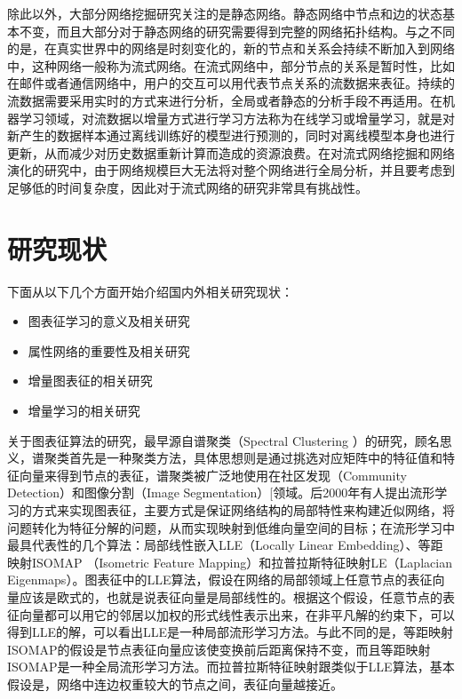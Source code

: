 除此以外，大部分网络挖掘研究关注的是静态网络。静态网络中节点和边的状态基本不变，而且大部分对于静态网络的研究需要得到完整的网络拓扑结构。与之不同的是，在真实世界中的网络是时刻变化的，新的节点和关系会持续不断加入到网络中，这种网络一般称为流式网络\cite{aggarwal2014evolutionary}。在流式网络中，部分节点的关系是暂时性，比如在邮件或者通信网络中，用户的交互可以用代表节点关系的流数据来表征。持续的流数据需要采用实时的方式来进行分析，全局或者静态的分析手段不再适用。在机器学习领域，对流数据以增量方式进行学习方法称为在线学习或增量学习，就是对新产生的数据样本通过离线训练好的模型进行预测的，同时对离线模型本身也进行更新，从而减少对历史数据重新计算而造成的资源浪费。在对流式网络挖掘和网络演化的研究中，由于网络规模巨大无法将对整个网络进行全局分析，并且要考虑到足够低的时间复杂度，因此对于流式网络的研究非常具有挑战性\cite{zhao2011gsketch,le2012linked}。

\section{研究现状}
下面从以下几个方面开始介绍国内外相关研究现状：
\begin{itemize}
\item {图表征学习的意义及相关研究}
\item {属性网络的重要性及相关研究}
\item {增量图表征的相关研究}
\item {增量学习的相关研究}
\end{itemize}

关于图表征算法的研究，最早源自谱聚类（Spectral Clustering ）的研究，顾名思义，谱聚类首先是一种聚类方法，具体思想则是通过挑选对应矩阵中的特征值和特征向量来得到节点的表征，谱聚类被广泛地使用在社区发现（Community Detection）\cite{leskovec2010empirical}和图像分割（Image Segmentation）[\cite{shi2000normalized}领域。后2000年有人提出流形学习的方式来实现图表征，主要方式是保证网络结构的局部特性来构建近似网络，将问题转化为特征分解的问题，从而实现映射到低维向量空间的目标；在流形学习中最具代表性的几个算法：局部线性嵌入\cite{roweis2000nonlinear}LLE（Locally Linear Embedding）、等距映射ISOMAP\cite{tenenbaum2000global} （Isometric Feature Mapping）和拉普拉斯特征映射LE\cite{belkin2002laplacian}（Laplacian Eigenmaps）。图表征中的LLE算法，假设在网络的局部领域上任意节点的表征向量应该是欧式的，也就是说表征向量是局部线性的。根据这个假设，任意节点的表征向量都可以用它的邻居以加权的形式线性表示出来，在非平凡解的约束下，可以得到LLE的解，可以看出LLE是一种局部流形学习方法。与此不同的是，等距映射ISOMAP的假设是节点表征向量应该使变换前后距离保持不变，而且等距映射ISOMAP是一种全局流形学习方法。而拉普拉斯特征映射跟类似于LLE算法，基本假设是，网络中连边权重较大的节点之间，表征向量越接近。

